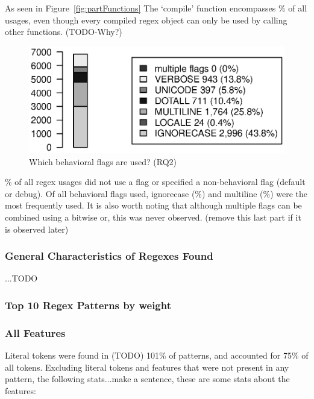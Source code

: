 As seen in Figure~\ref{fig:partFunctions} The `compile' function encompasses \% of all usages, even though every compiled regex object can only be used by calling other functions.  (TODO-Why?)

\begin{figure}[tb]
\centering
\includegraphics[width=\columnwidth]{../analysis_output/partFlags.eps}
\caption{Which behavioral flags are used? (RQ2)}
\label{fig:digraph}
\end{figure}

\% of all regex usages did not use a flag or specified a non-behavioral flag (default or debug).  Of all behavioral flags used, ignorecase (\%) and multiline (\%) were the most frequently used.  It is also worth noting that although multiple flags can be combined using a bitwise or, this was never observed. (remove this last part if it is observed later)

\subsubsection{{General Characteristics of Regexes Found}}

...TODO

\subsubsection{{Top 10 Regex Patterns by weight}}




\subsubsection{All Features}

Literal tokens were found in (TODO) 101\% of patterns, and accounted for 75\% of all tokens.  Excluding literal tokens and features that were not present in any pattern, the following stats...make a sentence, these are some stats about the features:

